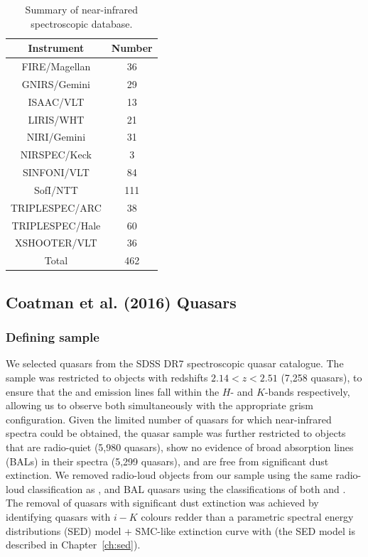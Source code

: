 \begin{table}
  \small
  \centering
  \caption{Summary of near-infrared spectroscopic database.}
  \label{tab:data_summary}
    \begin{tabular}{cc} 
    \hline
    Instrument & Number \\  
    \hline
    FIRE/Magellan   & 36 \\
    GNIRS/Gemini    & 29 \\
    ISAAC/VLT       & 13  \\
    LIRIS/WHT       & 21  \\
    NIRI/Gemini     & 31 \\
    NIRSPEC/Keck    & 3   \\ 
    SINFONI/VLT     & 84 \\
    SofI/NTT        & 111 \\
    TRIPLESPEC/ARC  & 38 \\
    TRIPLESPEC/Hale & 60 \\
    XSHOOTER/VLT    & 36  \\
    \hline
    Total & 462 \\
    \hline
    \end{tabular}
\end{table}

\subsection{Coatman et al. (2016) Quasars}

\subsubsection{Defining sample}

We selected quasars from the SDSS DR7 spectroscopic quasar catalogue. 
The sample was restricted to objects with redshifts $2.14 < z <2.51$ (7,258 quasars), to ensure that the \hb and \ha emission lines fall within the $H$- and $K$-bands respectively, allowing us to observe both simultaneously with the appropriate grism configuration.
Given the limited number of quasars for which near-infrared spectra could be obtained, the quasar sample was further restricted to objects that are radio-quiet (5,980 quasars), show no evidence of broad absorption lines (BALs) in their spectra (5,299 quasars), and are free from significant dust extinction. 
We removed radio-loud objects from our sample using the same radio-loud classification as \citet{shen11}, and BAL quasars using the classifications of both \citet{shen11} and \citet{allen11}. 
The removal of quasars with significant dust extinction was achieved by identifying quasars with $i-K$ colours redder than a parametric spectral energy distributions (SED) model + SMC-like extinction curve with  (the SED model is described in Chapter~\ref{ch:sed}). 

